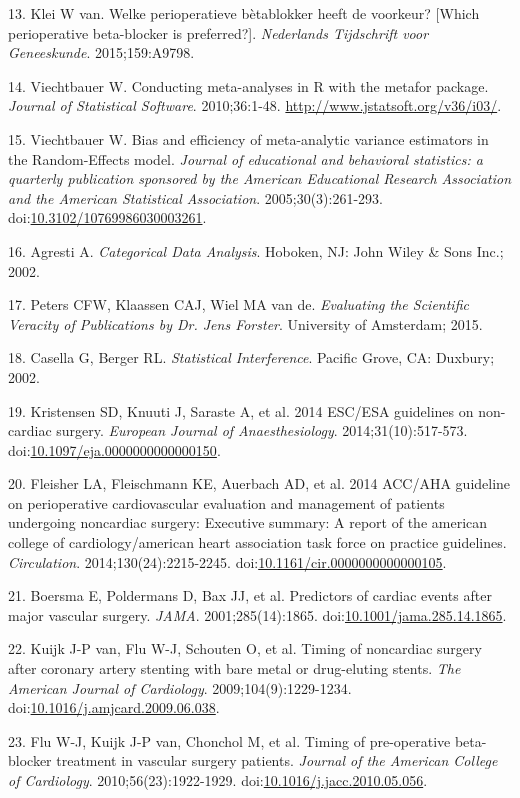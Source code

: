 \documentclass[]{article}
\begin{document}
\hypertarget{ref-klei2015}{}
13. Klei W van. Welke perioperatieve bètablokker heeft de voorkeur?
{[}Which perioperative beta-blocker is preferred?{]}. \emph{Nederlands
Tijdschrift voor Geneeskunde}. 2015;159:A9798.

\hypertarget{ref-viechtbauer2010}{}
14. Viechtbauer W. Conducting meta-analyses in R with the metafor
package. \emph{Journal of Statistical Software}. 2010;36:1-48.
\url{http://www.jstatsoft.org/v36/i03/}.

\hypertarget{ref-viechtbauer2005}{}
15. Viechtbauer W. Bias and efficiency of meta-analytic variance
estimators in the Random-Effects model. \emph{Journal of educational and
behavioral statistics: a quarterly publication sponsored by the American
Educational Research Association and the American Statistical
Association}. 2005;30(3):261-293.
doi:\href{https://doi.org/10.3102/10769986030003261}{10.3102/10769986030003261}.

\hypertarget{ref-agresti2002}{}
16. Agresti A. \emph{Categorical Data Analysis}. Hoboken, NJ: John Wiley
\& Sons Inc.; 2002.

\hypertarget{ref-peters2015}{}
17. Peters CFW, Klaassen CAJ, Wiel MA van de. \emph{Evaluating the
Scientific Veracity of Publications by Dr. Jens Forster}. University of
Amsterdam; 2015.

\hypertarget{ref-casella2002}{}
18. Casella G, Berger RL. \emph{Statistical Interference}. Pacific
Grove, CA: Duxbury; 2002.

\hypertarget{ref-Kristensen_2014}{}
19. Kristensen SD, Knuuti J, Saraste A, et al. 2014 ESC/ESA guidelines
on non-cardiac surgery. \emph{European Journal of Anaesthesiology}.
2014;31(10):517-573.
doi:\href{https://doi.org/10.1097/eja.0000000000000150}{10.1097/eja.0000000000000150}.

\hypertarget{ref-Fleisher_2014}{}
20. Fleisher LA, Fleischmann KE, Auerbach AD, et al. 2014 ACC/AHA
guideline on perioperative cardiovascular evaluation and management of
patients undergoing noncardiac surgery: Executive summary: A report of
the american college of cardiology/american heart association task force
on practice guidelines. \emph{Circulation}. 2014;130(24):2215-2245.
doi:\href{https://doi.org/10.1161/cir.0000000000000105}{10.1161/cir.0000000000000105}.

\hypertarget{ref-Boersma_2001}{}
21. Boersma E, Poldermans D, Bax JJ, et al. Predictors of cardiac events
after major vascular surgery. \emph{JAMA}. 2001;285(14):1865.
doi:\href{https://doi.org/10.1001/jama.285.14.1865}{10.1001/jama.285.14.1865}.

\hypertarget{ref-van_Kuijk_2009}{}
22. Kuijk J-P van, Flu W-J, Schouten O, et al. Timing of noncardiac
surgery after coronary artery stenting with bare metal or drug-eluting
stents. \emph{The American Journal of Cardiology}.
2009;104(9):1229-1234.
doi:\href{https://doi.org/10.1016/j.amjcard.2009.06.038}{10.1016/j.amjcard.2009.06.038}.

\hypertarget{ref-Flu_2010}{}
23. Flu W-J, Kuijk J-P van, Chonchol M, et al. Timing of pre-operative
beta-blocker treatment in vascular surgery patients. \emph{Journal of
the American College of Cardiology}. 2010;56(23):1922-1929.
doi:\href{https://doi.org/10.1016/j.jacc.2010.05.056}{10.1016/j.jacc.2010.05.056}.
\end{document}
